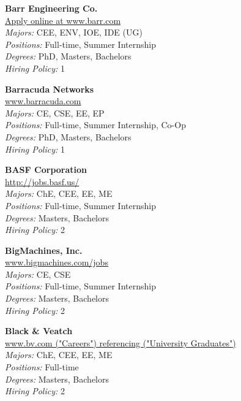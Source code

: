 \documentclass[twoside]{article}
\begin{document}
\begin{center}
\begin{multicols}{3}
\begin{minipage}{.9\columnwidth}{\Large\bf Barr Engineering Co. }\\
	\url{Apply online at www.barr.com}\\
	\emph{Majors:} CEE, ENV, IOE, IDE (UG)\\
	\emph{Positions:} Full-time, Summer Internship\\
	\emph{Degrees:} PhD, Masters, Bachelors\\
	\emph{Hiring Policy:} 1\\
\end{minipage}
 
\begin{minipage}{.9\columnwidth}{\Large\bf Barracuda Networks }\\
	\url{www.barracuda.com}\\
	\emph{Majors:} CE, CSE, EE, EP\\
	\emph{Positions:} Full-time, Summer Internship, Co-Op\\
	\emph{Degrees:} PhD, Masters, Bachelors\\
	\emph{Hiring Policy:} 1\\
\end{minipage}
 
\begin{minipage}{.9\columnwidth}{\Large\bf BASF Corporation }\\
	\url{http://jobs.basf.us/}\\
	\emph{Majors:} ChE, CEE, EE, ME\\
	\emph{Positions:} Full-time, Summer Internship\\
	\emph{Degrees:} Masters, Bachelors\\
	\emph{Hiring Policy:} 2\\
\end{minipage}
 
\begin{minipage}{.9\columnwidth}{\Large\bf BigMachines, Inc. }\\
	\url{www.bigmachines.com/jobs}\\
	\emph{Majors:} CE, CSE\\
	\emph{Positions:} Full-time, Summer Internship\\
	\emph{Degrees:} Masters, Bachelors\\
	\emph{Hiring Policy:} 2\\
\end{minipage}
 
\begin{minipage}{.9\columnwidth}{\Large\bf Black \& Veatch }\\
	\url{www.bv.com ("Careers") referencing ("University Graduates")}\\
	\emph{Majors:} ChE, CEE, EE, ME\\
	\emph{Positions:} Full-time\\
	\emph{Degrees:} Masters, Bachelors\\
	\emph{Hiring Policy:} 2\\
\end{minipage}
 

\end{multicols}
\end{center}
\end{document}
